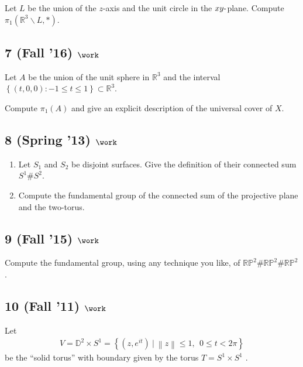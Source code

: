 Let \(L\) be the union of the \(z\)-axis and the unit circle in the
\(xy{\hbox{-}}\)plane. Compute
\(\pi_1 ({\mathbb{R}}^3 \backslash L, \ast)\).

\hypertarget{fall-16-work-2}{%
\subsection{\texorpdfstring{7 (Fall '16)
\(\work\)}{7 (Fall '16) \textbackslash work}}\label{fall-16-work-2}}

Let \(A\) be the union of the unit sphere in \({\mathbb{R}}^3\) and the
interval
\(\left\{{(t, 0, 0) : -1 \leq t \leq 1}\right\} \subset {\mathbb{R}}^3\).

Compute \(\pi_1 (A)\) and give an explicit description of the universal
cover of \(X\).

\hypertarget{spring-13-work-1}{%
\subsection{\texorpdfstring{8 (Spring '13)
\(\work\)}{8 (Spring '13) \textbackslash work}}\label{spring-13-work-1}}

\begin{enumerate}
\def\labelenumi{\alph{enumi}.}
\item
  Let \(S_1\) and \(S_2\) be disjoint surfaces. Give the definition of
  their connected sum \(S^1 \#S^2\).
\item
  Compute the fundamental group of the connected sum of the projective
  plane and the two-torus.
\end{enumerate}

\hypertarget{fall-15-work}{%
\subsection{\texorpdfstring{9 (Fall '15)
\(\work\)}{9 (Fall '15) \textbackslash work}}\label{fall-15-work}}

Compute the fundamental group, using any technique you like, of
\({\mathbb{RP}}^2 \#{\mathbb{RP}}^2 \#{\mathbb{RP}}^2\).

\hypertarget{fall-11-work-1}{%
\subsection{\texorpdfstring{10 (Fall '11)
\(\work\)}{10 (Fall '11) \textbackslash work}}\label{fall-11-work-1}}

Let
\begin{align*}
V = {\mathbb{D}}^2 \times S^1 = \left\{{ (z, e^{it}) {~\mathrel{\Big|}~}{\left\lVert {z} \right\rVert} \leq 1,~~ 0 \leq t < 2\pi}\right\}
\end{align*}
be the ``solid torus'' with boundary given by the torus
\(T = S^1 \times S^1\) .

